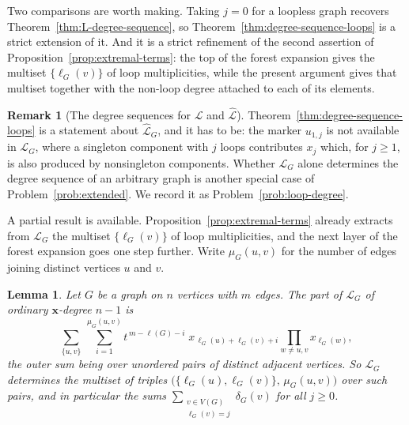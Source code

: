 \documentclass[11pt]{article}
\theoremstyle{plain}
\newtheorem{lemma}[theorem]{Lemma}
\theoremstyle{definition}
\newtheorem{remark}[theorem]{Remark}
\renewcommand{\mathcal}{\mathscr}
\newcommand{\ds}{\displaystyle}
\newcommand{\LL}{\mathcal{L}}    %
\newcommand{\bx}{\mathbf{x}}
\numberwithin{equation}{section}
\begin{document}
Two comparisons are worth making.  Taking $j=0$ for a loopless graph
recovers Theorem~\ref{thm:L-degree-sequence}, so
Theorem~\ref{thm:degree-sequence-loops} is a strict extension of it.  And it
is a strict refinement of the second assertion of
Proposition~\ref{prop:extremal-terms}: the top of the forest expansion
gives the multiset $\{\ell_G(v)\}$ of loop multiplicities, while the
present argument gives that multiset together with the non-loop degree attached to each of its elements.

\begin{remark}[The degree sequences for $\LL$ and  $\widehat{\LL}$]
\label{rem:degree-L-vs-Lhat}
Theorem~\ref{thm:degree-sequence-loops} is a statement about
$\widehat{\LL}_G$, and it has to be: the marker $u_{1,j}$ is not available
in $\LL_G$, where a singleton component with $j$ loops contributes $x_j$
which, for $j\ge 1$, is also produced by nonsingleton components.
Whether $\LL_G$ alone determines the degree sequence of an arbitrary graph is another special case of Problem~\ref{prob:extended}. We record it as
Problem~\ref{prob:loop-degree}.
\end{remark}

A partial result is available.
Proposition~\ref{prop:extremal-terms} already extracts
from $\LL_G$ the multiset $\{\ell_G(v)\}$ of loop multiplicities, and the
next layer of the forest expansion goes one step further.  Write
$\mu_G(u,v)$ for the number of edges joining distinct vertices $u$ and $v$.

\begin{lemma}\label{lem:second-layer}
Let $G$ be a graph on $n$ vertices with $m$ edges.  The part of $\LL_G$ of
ordinary $\bx$-degree $n-1$ is
\begin{equation}\label{eq:second-layer}
   \sum_{\{u,v\}}\ \sum_{i=1}^{\mu_G(u,v)}
      t^{\,m-\ell(G)-i}\;
      x_{\,\ell_G(u)+\ell_G(v)+i}
      \prod_{w\ne u,v}x_{\ell_G(w)},
\end{equation}
the outer sum being over unordered pairs of distinct adjacent vertices.
So $\LL_G$ determines the multiset of triples
$\bigl(\{\ell_G(u),\ell_G(v)\},\,\mu_G(u,v)\bigr)$ over such pairs, and in particular the sums
$\ds \sum_{\substack{v\in V(G)\\ \ell_G(v)=j}}
\delta_G(v)$ for all $j\ge 0$.
\end{lemma}
\end{document}

